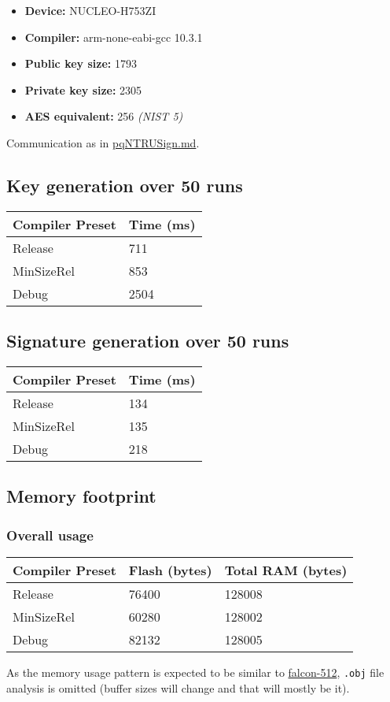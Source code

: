 \documentclass[
]{article}
\providecommand{\tightlist}{%
  \setlength{\itemsep}{0pt}\setlength{\parskip}{0pt}}
\begin{document}
\begin{itemize}
\tightlist
\item
  \textbf{Device:} NUCLEO-H753ZI
\item
  \textbf{Compiler:} arm-none-eabi-gcc 10.3.1
\item
  \textbf{Public key size:} 1793
\item
  \textbf{Private key size:} 2305
\item
  \textbf{AES equivalent:} 256 \textit{(NIST 5)}
\end{itemize}

Communication as in \url{pqNTRUSign.md}.

\hypertarget{key-generation-over-50-runs-1}{%
\subsection{Key generation over 50
runs}\label{key-generation-over-50-runs-1}}

\begin{longtable}[]{@{}ll@{}}
\toprule
Compiler Preset & Time (ms)\tabularnewline
\midrule
\endhead
Release & 711\tabularnewline
MinSizeRel & 853\tabularnewline
Debug & 2504\tabularnewline
\bottomrule
\end{longtable}

\hypertarget{signature-generation-over-50-runs-1}{%
\subsection{Signature generation over 50
runs}\label{signature-generation-over-50-runs-1}}

\begin{longtable}[]{@{}ll@{}}
\toprule
Compiler Preset & Time (ms)\tabularnewline
\midrule
\endhead
Release & 134\tabularnewline
MinSizeRel & 135\tabularnewline
Debug & 218\tabularnewline
\bottomrule
\end{longtable}

\hypertarget{memory-footprint-2}{%
\subsection{Memory footprint}\label{memory-footprint-2}}

\hypertarget{overall-usage-2}{%
\subsubsection{Overall usage}\label{overall-usage-2}}

\begin{longtable}[]{@{}lll@{}}
\toprule
Compiler Preset & Flash (bytes) & Total RAM (bytes)\tabularnewline
\midrule
\endhead
Release & 76400 & 128008\tabularnewline
MinSizeRel & 60280 & 128002\tabularnewline
Debug & 82132 & 128005\tabularnewline
\bottomrule
\end{longtable}

As the memory usage pattern is expected to be similar to
\href{falcon-512.md}{falcon-512}, \texttt{.obj} file analysis is omitted
(buffer sizes will change and that will mostly be it).
\end{document}
